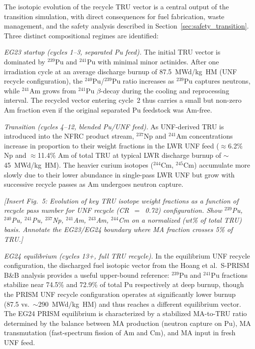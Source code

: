 \documentclass[10pt,twoside]{article}
\newcommand{\placeholder}[1]{%
  \textcolor{placeholder}{\textit{[#1]}}}
\begin{document}
The isotopic evolution of the recycle TRU vector is a
central output of the transition simulation, with direct
consequences for fuel fabrication, waste management, and
the safety analysis described in Section~\ref{sec:safety_transition}.
Three distinct compositional regimes are identified:

\textit{EG23 startup (cycles 1--3, separated Pu feed).}
The initial TRU vector is dominated by $^{239}$Pu and $^{241}$Pu
with minimal minor actinides.  After one irradiation cycle
at an average discharge burnup of 87.5~MWd/kg~HM (UNF recycle
configuration), the $^{240}$Pu/$^{239}$Pu ratio increases as
$^{239}$Pu captures neutrons, while $^{241}$Am grows from
$^{241}$Pu $\beta$-decay during the cooling and reprocessing
interval.  The recycled vector entering cycle~2 thus carries
a small but non-zero Am fraction even if the original separated
Pu feedstock was Am-free.

\textit{Transition (cycles 4--12, blended Pu/UNF feed).}
As UNF-derived TRU is introduced into the NFRC product stream,
$^{237}$Np and $^{241}$Am concentrations increase in proportion
to their weight fractions in the LWR UNF feed ($\approx$6.2\%
Np and $\approx$11.4\% Am of total TRU at typical LWR discharge
burnup of $\sim$45~MWd/kg~HM).  The heavier curium isotopes
($^{244}$Cm, $^{245}$Cm) accumulate more slowly due to their
lower abundance in single-pass LWR UNF but grow with successive
recycle passes as Am undergoes neutron capture.

\placeholder{Insert Fig.~5: Evolution of key TRU isotope weight
  fractions as a function of recycle pass number for UNF recycle
  (CR~$=$~0.72) configuration.  Show $^{239}$Pu, $^{240}$Pu,
  $^{241}$Pu, $^{237}$Np, $^{241}$Am, $^{243}$Am, $^{244}$Cm
  on a normalized (wt\% of total TRU) basis.  Annotate the
  EG23/EG24 boundary where MA fraction crosses 5\% of TRU.}

\textit{EG24 equilibrium (cycles 13+, full TRU recycle).}
In the equilibrium UNF recycle configuration, the discharged
fuel isotopic vector from the Hoang et al.\ S-PRISM B\&B analysis
provides a useful upper-bound reference: $^{239}$Pu and $^{241}$Pu
fractions stabilize near 74.5\% and 72.9\% of total Pu respectively
at deep burnup,\cite{Hoang2022} though the PRISM UNF recycle
configuration operates at significantly lower burnup (87.5 vs.\
$\sim$290~MWd/kg~HM) and thus reaches a different equilibrium
vector.  The EG24 PRISM equilibrium is characterized by a
stabilized MA-to-TRU ratio determined by the balance between
MA production (neutron capture on Pu), MA transmutation
(fast-spectrum fission of Am and Cm), and MA input in fresh UNF feed.
\end{document}
